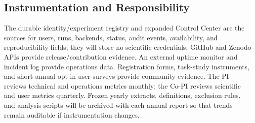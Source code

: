 \subsection*{Instrumentation and Responsibility}

The durable identity/experiment registry and expanded Control Center are the
sources for users, runs, backends, status, audit events, availability, and
reproducibility fields; they will store no scientific credentials.
GitHub and Zenodo APIs provide release/contribution evidence. An external
uptime monitor and incident log provide operations data. Registration forms,
task-study instruments, and short annual opt-in user surveys provide community
evidence. The PI reviews technical and operations metrics monthly; the Co-PI
reviews scientific and user metrics quarterly. Frozen yearly extracts,
definitions, exclusion rules, and analysis scripts will be archived with each
annual report so that trends remain auditable if instrumentation changes.
